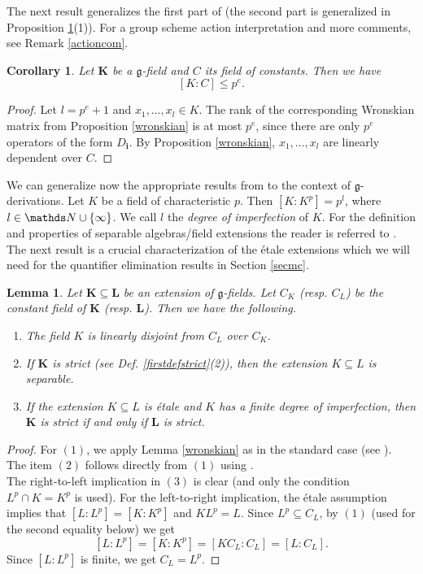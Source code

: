 \documentclass[10pt]{amsart}
\newtheorem{lemma}[theorem]{Lemma}
\newtheorem{cor}[theorem]{Corollary}
\theoremstyle{definition}
\begin{document}
\noindent
The next result generalizes the first part of \cite[Lemma 2.1]{Zieg2} (the second part is generalized in Proposition \ref{constantdisjoint}(1)). For a group scheme action interpretation and more comments, see Remark \ref{actioncom}.
\begin{cor}\label{dimconstants}
Let $\mathbf{K}$ be a $\mathfrak{g}$-field and $C$ its field of constants. Then we have
$$[K:C]\leqslant p^e.$$
\end{cor}
\begin{proof}
Let $l=p^e+1$ and $x_1,\ldots,x_l\in K$. The rank of the corresponding Wronskian matrix from Proposition \ref{wronskian} is at most $p^e$, since there are only $p^e$ operators of the form $D_{\mathbf{i}}$. By Proposition \ref{wronskian}, $x_1,\ldots,x_l$ are linearly dependent over $C$.
\end{proof}
\noindent
We can generalize now the appropriate results from \cite{Zieg2} to the context of $\mathfrak{g}$-derivations. Let $K$ be a field of characteristic $p$. Then $[K:K^p]=p^l$, where $l\in \Nn\cup \{\infty\}$. We call $l$ the \emph{degree of imperfection} of $K$. For the definition and properties of separable algebras/field extensions the reader is referred to \cite[Sect. 26]{mat}. The next result is a crucial characterization of the \'{e}tale extensions which we will need for the quantifier elimination results in Section \ref{secmc}.
\begin{lemma}\label{constantdisjoint}
Let $\mathbf{K}\subseteq \mathbf{L}$ be an extension of $\mathfrak{g}$-fields. Let $C_K$ (resp. $C_L$) be the constant field of $\mathbf{K}$ (resp. $\mathbf{L}$). Then we have the following.
\begin{enumerate}
\item The field $K$ is linearly disjoint from $C_L$ over $C_K$.

\item If $\mathbf{K}$ is strict (see Def. \ref{firstdefstrict}(2)), then the extension $K\subseteq L$ is separable.

\item If the extension $K\subseteq L$ is \'{e}tale and $K$ has a finite degree of imperfection, then $\mathbf{K}$ is strict if and only if $\mathbf{L}$ is strict.
\end{enumerate}
\end{lemma}
\begin{proof}
For $(1)$, we apply Lemma \ref{wronskian} as in the standard case (see  \cite[Cor. 1, p. 87]{kol1}).
\\
The item $(2)$ follows directly from $(1)$ using \cite[Thm. 26.4]{mat}.
\\
The right-to-left implication in $(3)$ is clear (and only the condition $L^p\cap K=K^p$ is used). For the left-to-right implication, the \'{e}tale assumption implies that $[L:L^p]=[K:K^p]$ and $KL^p=L$. Since $L^p\subseteq C_L$, by $(1)$ (used for the second equality below) we get
$$[L:L^p]=[K:K^p]=[KC_L:C_L]=[L:C_L].$$
Since $[L:L^p]$ is finite, we get $C_L=L^p$.
\end{proof}
\end{document}
